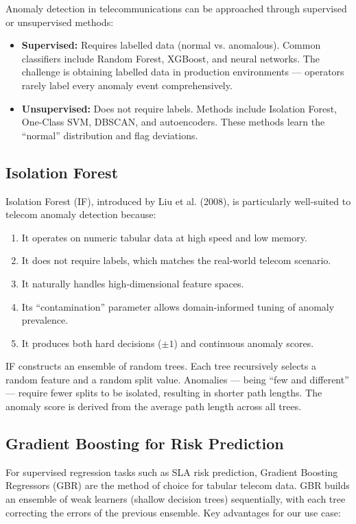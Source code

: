 Anomaly detection in telecommunications can be approached through supervised or unsupervised methods:

\begin{itemize}
  \item \textbf{Supervised:} Requires labelled data (normal vs. anomalous). Common classifiers include Random Forest, XGBoost, and neural networks. The challenge is obtaining labelled data in production environments --- operators rarely label every anomaly event comprehensively.
  \item \textbf{Unsupervised:} Does not require labels. Methods include Isolation Forest, One-Class SVM, DBSCAN, and autoencoders. These methods learn the ``normal'' distribution and flag deviations.
\end{itemize}

\subsection{Isolation Forest}

Isolation Forest (IF), introduced by Liu et al. (2008), is particularly well-suited to telecom anomaly detection because:

\begin{enumerate}
  \item It operates on numeric tabular data at high speed and low memory.
  \item It does not require labels, which matches the real-world telecom scenario.
  \item It naturally handles high-dimensional feature spaces.
  \item Its ``contamination'' parameter allows domain-informed tuning of anomaly prevalence.
  \item It produces both hard decisions ($\pm 1$) and continuous anomaly scores.
\end{enumerate}

IF constructs an ensemble of random trees. Each tree recursively selects a random feature and a random split value. Anomalies --- being ``few and different'' --- require fewer splits to be isolated, resulting in shorter path lengths. The anomaly score is derived from the average path length across all trees.

\subsection{Gradient Boosting for Risk Prediction}

For supervised regression tasks such as SLA risk prediction, Gradient Boosting Regressors (GBR) are the method of choice for tabular telecom data. GBR builds an ensemble of weak learners (shallow decision trees) sequentially, with each tree correcting the errors of the previous ensemble. Key advantages for our use case:

